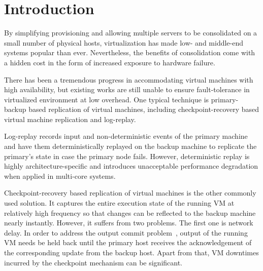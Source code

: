 \section{Introduction} \label{sec:intro}

By simplifying provisioning and allowing multiple servers to be consolidated on a small 
number of physical hosts, virtualization has made low- and middle-end systems popular 
than ever. Nevertheless, the benefits of consolidation come with a hidden cost in the 
form of increased exposure to hardware failure. 



There has been a tremendous progress in accommodating virtual machines with high availability, 
but existing works are still unable to ensure fault-tolerance in virtualized environment at 
low overhead. One typical technique is primary-backup based replication of virtual machines, 
including checkpoint-recovery based virtual machine replication and log-replay.



Log-replay records input and non-deterministic events of the primary machine and have them 
deterministically replayed on the backup machine to replicate the primary's state in case 
the primary node fails. However, deterministic replay is highly architecture-specific and 
introduces unacceptable performance degradation when applied in multi-core systems.

Checkpoint-recovery based replication of virtual machines is the other commonly used solution. 
It captures the entire execution state of the running VM at relatively high frequency so that 
changes can be reflected to the backup machine nearly instantly. However, it suffers from two 
problems. The first one is network delay. In order to address the output commit 
problem~\cite{strom1987volatile}, output of the running VM needs be held back until the primary 
host receives the acknowledgement of the corresponding update from the backup host. Apart from 
that, VM downtimes incurred by the checkpoint mechanism can be significant.

